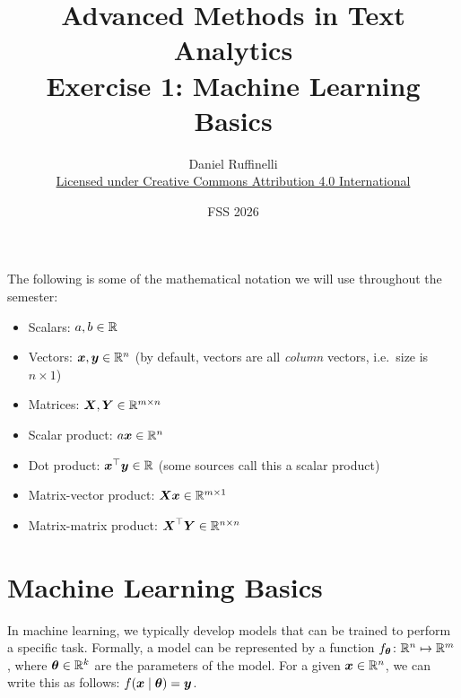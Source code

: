 \documentclass[11pt,a4paper]{article}
\title{Advanced Methods in Text Analytics \\ 
Exercise 1: Machine Learning Basics}
\author{Daniel Ruffinelli \\ \href{https://creativecommons.org/licenses/by/4.0/}{Licensed under Creative Commons Attribution 4.0 International}}
\date{FSS 2026}
\begin{document}
\maketitle

The following is some of the mathematical notation we will use throughout the
semester:

\begin{itemize}
    \item Scalars: $a,b\in\mathbb{R}$
    \item Vectors: ${\boldsymbol{x}},{\boldsymbol{y}}\in\mathbb{R}^n$ (by default, vectors are all \emph{column}
          vectors, i.e.\ size is $n\times 1$)
    \item Matrices: ${\boldsymbol{X}},{\boldsymbol{Y}}\in\mathbb{R}^{m\times n}$
    \item Scalar product: $a{\boldsymbol{x}}\in\mathbb{R}^n$
    \item Dot product: ${\boldsymbol{x}}^\top{\boldsymbol{y}}\in\mathbb{R}$ (some sources call this a scalar product)
    \item Matrix-vector product: ${\boldsymbol{X}}{\boldsymbol{x}}\in\mathbb{R}^{m\times 1}$
    \item Matrix-matrix product: ${\boldsymbol{X}}^\top{\boldsymbol{Y}}\in\mathbb{R}^{n\times n}$
\end{itemize}

\section{Machine Learning Basics}

In machine learning, we typically develop models that can be trained to perform
a specific task.
Formally, a model can be represented by a function
$f_{{\boldsymbol{\theta}}}\colon \mathbb{R}^n\mapsto \mathbb{R}^m$, where ${\boldsymbol{\theta}}\in\mathbb{R}^k$ are the
parameters of the model.
For a given ${\boldsymbol{x}}\in\mathbb{R}^n$, we can write this as follows:
$f({\boldsymbol{x}}\mid{\boldsymbol{\theta}}) = {\boldsymbol{y}}$.
\end{document}
